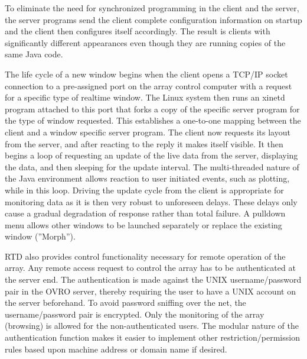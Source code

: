 \documentclass[preprint]{aastex}
\begin{document}
To eliminate the need for synchronized programming in the client
and the server, the server programs send the client complete
configuration information on startup and the client then configures
itself accordingly. The result is clients with significantly different
appearances even though they are running copies of the same Java code.

The life cycle of a new window begins when the client opens a TCP/IP
socket connection to a pre-assigned port on the array control computer
with a request for a specific type of realtime window. The Linux system
then runs an xinetd program attached to this port that forks a copy
of the specific server program for the type of window requested. This
establishes a one-to-one mapping between the client and a window specific
server program. The client now requests its layout from the server, and
after reacting to the reply it makes itself visible. It then begins a loop
of requesting an update of the live data from the server, displaying the
data, and then sleeping for the update interval. The multi-threaded nature
of the Java environment allows reaction to user initiated events, such as
plotting, while in this loop. Driving the update cycle from the client is
appropriate for monitoring data as it is then very robust to unforeseen
delays. These delays only cause a gradual degradation of response rather
than total failure.
A pulldown menu allows other windows to be launched separately or 
replace the existing window (''Morph''). 

RTD also provides control functionality necessary for remote operation
of the array.  Any remote access request to control the array has to be
authenticated at the server end. The authentication is made against the
UNIX username/password pair in the OVRO server, thereby requiring the
user to have a UNIX account on the server beforehand. To avoid password
sniffing over the net, the username/password pair is encrypted. Only the
monitoring of the array (browsing) is allowed for the non-authenticated
users. The modular nature of the authentication function makes it easier
to implement other restriction/permission rules based upon machine address
or domain name if desired.
\end{document}
